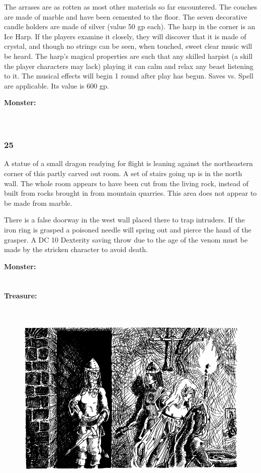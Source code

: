 \documentclass[palace_of_the_silver_princess]{subfiles}
\begin{document}
The arrases are as rotten as most other materials so far encountered.
The couches are made of marble and have been cemented to the floor. The
seven decorative candle holders are made of silver (value 50 gp each).
The harp in the corner is an Ice Harp. If the players examine it
closely, they will discover that it is made of crystal, and though no
strings can be seen, when touched, sweet clear music will be heard. The
harp’s magical properties are such that any skilled harpist (a skill the
player characters may lack) playing it can calm and relax any beast
listening to it. The musical effects will begin 1 round after play has
begun. Saves vs. Spell are applicable. Its value is 600 gp.

\textbf{Monster:}
\\
\\
\\

\subsubsection{25}
\begin{quotebox}
    A statue of a small dragon readying for flight is leaning against
    the northeastern corner of this partly carved out room. A set of
    stairs going up is in the north wall. The whole room appears to have
    been cut from the living rock, instead of built from rocks brought
    in from mountain quarries. This area does not appear to be made from
    marble.
\end{quotebox}

There is a false doorway in the west wall placed there to trap
intruders. If the iron ring is grasped a poisoned needle will spring out
and pierce the hand of the grasper. A DC 10 Dexterity saving throw due
to the age of the venom must be made by the stricken character to avoid
death.

\textbf{Monster:}
\\
\\
\\
\textbf{Treasure:}
\\
\\
\\

\begin{figure}[ht]
    \includegraphics[width=\textwidth]{img/travis.png}
\end{figure}
\end{document}
